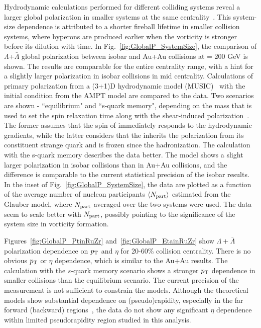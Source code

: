 \documentclass[preprint,5p,times,twocolumn]{elsarticle}
\begin{document}
Hydrodynamic calculations performed for different colliding systems reveal a larger global polarization in smaller systems at the same centrality~\cite{Shi:2017wpk,Alzhrani:2022dpi}.
This system-size dependence is attributed to a shorter fireball lifetime in smaller collision systems, where \lam hyperons are produced earlier when the vorticity is stronger before its dilution with time.
In Fig.~\ref{fig:GlobalP_SystemSize}, the comparison of $\Lambda$+$\bar\Lambda$ global polarization between isobar and Au+Au collisions at \snn = 200 GeV is shown.  
The results are comparable for the entire centrality range, with a hint for a slightly larger polarization in isobar collisions in mid centrality. 
Calculations of primary \lam polarization from a (3+1)D hydrodynamic model (MUSIC)~\cite{Fu:2021pok} with the initial condition from the AMPT model are compared to the data. 
Two scenarios are shown - ``\lam equilibrium" and ``s-quark memory", depending on the mass that is used to set the spin relaxation time along with the shear-induced polarization~\cite{Fu:2021pok,Becattini:2021iol}.
The former assumes that the spin of \lam immediately responds to the hydrodynamic gradients, while the latter considers that the \lam inherits the polarization from its constituent strange quark and is frozen since the hadronization.
The calculation with the s-quark memory describes the data better. 
The model shows a slight larger polarization in isobar collisions than in Au+Au collisions, and the difference  is comparable to the current statistical precision of the isobar results.
In the inset of Fig.~\ref{fig:GlobalP_SystemSize}, the data are plotted as a function of the average number of nucleon participants $\langle N_{\rm part}\rangle$ estimated from the Glauber model, where $N_{\rm part}$ averaged over the two systems were used.
The data seem to scale better with $N_{\rm part}$, possibly pointing to the significance of the system size in vorticity formation.

Figures~\ref{fig:GlobalP_PtinRuZr} and~\ref{fig:GlobalP_EtainRuZr} show $\Lambda+\bar\Lambda$ polarization dependence on $p_{\rm T}$ and $\eta$ for 20-60\% collision centrality. 
There is no obvious $p_{\rm T}$ or $\eta$ dependence, which is similar to the Au+Au results.
The calculation with the $s$-quark memory scenario shows a stronger $p_{\rm T}$ dependence in smaller collisions than the \lam equilibrium scenario.
The current precision of the measurement is not sufficient to constrain the models.
Although the theoretical models show substantial dependence on (pseudo)rapidity, especially in the far forward (backward) regions~\cite{Wu:2019eyi,Xie:2019jun,Liang:2019pst}, the data do not show any significant $\eta$ dependence within limited pseudorapidity region studied in this analysis.
\end{document}
